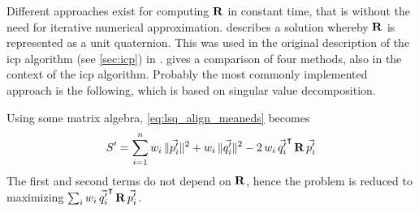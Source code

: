 Different approaches exist for computing $\mathbf{R}$ in constant time, that is without the need for iterative numerical approximation. \cite{Horn1986} describes a solution whereby $\mathbf{R}$ is represented as a unit quaternion. This was used in the original description of the \gls{icp} algorithm (see \ref{sec:icp}) in \cite{Besl1992}. \cite{Loru1995} gives a comparison of four methods, also in the context of the \gls{icp} algorithm. Probably the most commonly implemented approach is the following, which is based on singular value decomposition. \cite{Sork2009}

Using some matrix algebra, \ref{eq:lsq_align_meaneds} becomes
\begin{equation}
S' = \sum_{i=1}^{n} w_i \, \| \vec{p'_i} \|^2 + w_i \, \| \vec{q'_i} \|^2 - 2 \, w_i \, \vec{q'_i}^\intercal \, \mathbf{R} \, \vec{p'_i}
\end{equation}
The first and second terms do not depend on $\mathbf{R}$, hence the problem is reduced to maximizing $\sum_{i} w_i \, \vec{q'_i}^\intercal \, \mathbf{R} \, \vec{p'_i}$.

